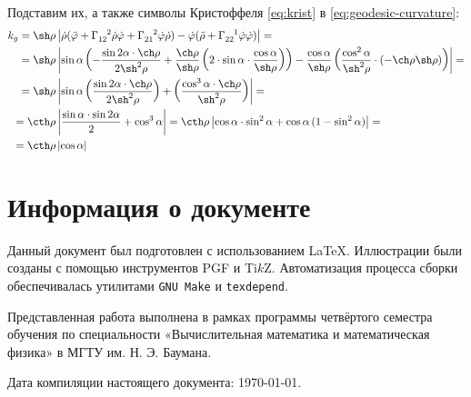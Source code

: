 \documentclass{article}
\numberwithin{equation}{section}
\renewcommand{\phi}{\varphi}
\newcommand{\krist}[3]{\Gamma^{\phantom{#1 #2}#3}_{#1 #2}}
\providecommand{\abs}[1]{\left \lvert{#1}\right \rvert}
\begin{document}
Подставим их, а также символы Кристоффеля \eqref{eq:krist} в
\eqref{eq:geodesic-curvature}:
\begin{equation*}\label{eq:con-geo-curvature}
  \begin{split}
    k_g = \sh\rho& \abs{\dot\rho(\ddot\phi +
      \krist{1}{2}{2}\dot\rho\dot\phi +
      \krist{2}{1}{2}\dot\phi\dot\rho) -
      \dot\phi(\ddot\rho + \krist{2}{2}{1}\dot\phi\dot\phi)} =\\
    =\sh\rho& \abs{\sin\alpha\left(-\frac{\sin{2\alpha} \cdot
          \ch\rho}{2\sh^2\rho} +
        \frac{\ch\rho}{\sh\rho}\left(2\cdot\sin\alpha\cdot\frac{\cos\alpha}{\sh\rho}\right)\right)
      - \frac{\cos\alpha}{\sh\rho}
      \left(\frac{\cos^2\alpha}{\sh^2\rho}\cdot\left(-\ch\rho
          \sh\rho\right)\right)} =\\
    =\sh\rho&
    \abs{\sin\alpha\left(\frac{\sin{2\alpha}\cdot\ch\rho}{2\sh^2\rho}\right)
      + \left(\frac{\cos^3\alpha\cdot\ch\rho}{\sh^2\rho}\right)} =\\
    =\cth\rho&\abs{\frac{\sin\alpha\cdot\sin{2\alpha}}{2}+\cos^3\alpha}
    = \cth\rho\abs{\cos\alpha\cdot\sin^2\alpha+\cos\alpha\,(1-\sin^2\alpha)} =\\
    = \cth\rho&\abs{\cos\alpha}    
  \end{split}
\end{equation*}

\clearpage
\appendix
\part{Информация о документе}
Данный документ был подготовлен с использованием \LaTeX{}. Иллюстрации
были созданы с помощью инструментов PGF и Ti$k$Z. Автоматизация
процесса сборки обеспечивалась утилитами \texttt{GNU Make} и
\texttt{texdepend}.

Представленная работа выполнена в рамках программы
четвёртого семестра обучения по специальности «Вычислительная
математика и математическая физика» в МГТУ им. Н. Э. Баумана.

Дата компиляции настоящего документа: \today.

\clearpage


\end{document}
